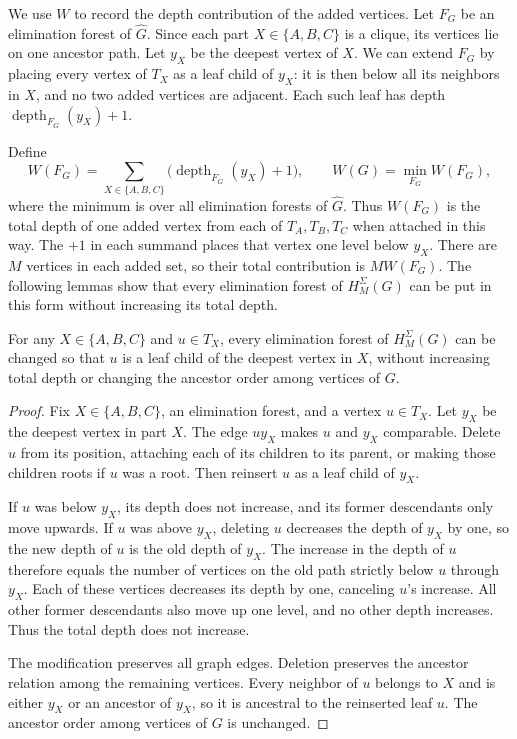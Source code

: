 We use $W$ to record the depth contribution of the added vertices.
Let $F_G$ be an elimination forest of $\widehat G$. Since each part
$X\in\{A,B,C\}$ is a clique, its vertices lie on one ancestor path.
Let $y_X$ be the deepest vertex of $X$. We can extend $F_G$ by placing
every vertex of $T_X$ as a leaf child of $y_X$: it is then below all
its neighbors in $X$, and no two added vertices are adjacent. Each
such leaf has depth $\operatorname{depth}_{F_G}(y_X)+1$.

Define
\[
 W(F_G)=\sum_{X\in\{A,B,C\}}
          \bigl(\operatorname{depth}_{F_G}(y_X)+1\bigr),
 \qquad W(G)=\min_{F_G}W(F_G),
\]
where the minimum is over all elimination forests of $\widehat G$.
Thus $W(F_G)$ is the total depth of one added vertex from each of
$T_A,T_B,T_C$ when attached in this way. The $+1$ in each summand
places that vertex one level below $y_X$. There are $M$ vertices in
each added set, so their total contribution is $MW(F_G)$.
The following lemmas show that every elimination forest of
$H^{\Sigma}_M(G)$ can be put in this form without increasing its total
depth.

\begin{lemma}\label{lem:added-vertex-move}
For any $X\in\{A,B,C\}$ and $u\in T_X$, every elimination forest
of $H^{\Sigma}_M(G)$ can be changed so that $u$ is a leaf child of
the deepest vertex in $X$, without increasing total depth or changing
the ancestor order among vertices of $G$.
\end{lemma}

\begin{proof}
Fix $X\in\{A,B,C\}$, an elimination forest, and a vertex $u\in T_X$.
Let $y_X$ be the deepest vertex in part $X$. The edge $uy_X$ makes
$u$ and $y_X$ comparable. Delete $u$ from its position, attaching
each of its children to its parent, or making those children roots
if $u$ was a root. Then reinsert $u$ as a leaf child of $y_X$.

If $u$ was below $y_X$, its depth does not increase, and its former
descendants only move upwards. If $u$ was above $y_X$, deleting $u$
decreases the depth of $y_X$ by one, so the new depth of $u$ is the
old depth of $y_X$. The increase in the depth of $u$ therefore equals
the number of vertices on the old path strictly below $u$ through
$y_X$. Each of these vertices decreases its depth by one, canceling
$u$'s increase. All other former descendants also move up one level,
and no other depth increases. Thus the total depth does not increase.

The modification preserves all graph edges. Deletion preserves the
ancestor relation among the remaining vertices. Every neighbor of
$u$ belongs to $X$ and is either $y_X$ or an ancestor of $y_X$, so it is ancestral
to the reinserted leaf $u$. The ancestor order among vertices of $G$
is unchanged.
\end{proof}

